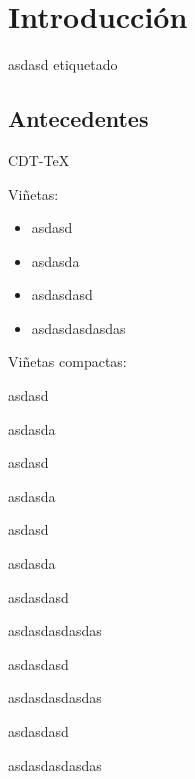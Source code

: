 \documentclass[10pt]{book}
\begin{document}
\thispagestyle{empty}

\maketitle

\cdtMakeDocInfo
\cdtMakeRelElements
\cdtMakeRelReferences
\cdtMakeObservaciones[2.5cm]
\cdtMakeFirmas

\frontmatter
\tableofcontents
\listoffigures
\listoftables
\mainmatter


\chapter{Introducción}

\begin{objetivos}
	\item asdasd  etiquetado
\end{objetivos}

\section{Antecedentes}

CDT-\TeX

Viñetas:

\begin{itemize}
	\item asdasd
	\item asdasda
	\item asdasdasd
	\item asdasdasdasdas
\end{itemize}


Viñetas compactas:

\begin{Citemize}
	\item asdasd
	\item asdasda
    \begin{Citemize}
    	\item asdasd
    	\item asdasda
        \begin{Citemize}
        	\item asdasd
        	\item asdasda
        	\item asdasdasd
        	\item asdasdasdasdas
        \end{Citemize}
    	\item asdasdasd
    	\item asdasdasdasdas
    \end{Citemize}
	\item asdasdasd
	\item asdasdasdasdas
\end{Citemize}
\end{document}
